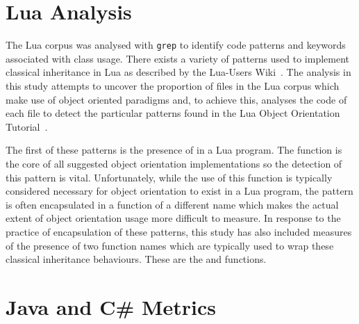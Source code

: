 \section{Lua Analysis}
\label{luaMethod}
The Lua corpus was analysed with \texttt{grep} to identify code patterns and keywords associated with class usage. There exists a variety of patterns used to implement classical inheritance in Lua as described by the Lua-Users Wiki~\cite{LuaObjectOrientation}. The analysis in this study attempts to uncover the proportion of files in the Lua corpus which make use of object oriented paradigms and, to achieve this, analyses the code of each file to detect the particular patterns found in the Lua Object Orientation Tutorial~\cite{LuaObjectOrientation}.
\newline

The first of these patterns is the presence of  in a Lua program. The  function is the core of all suggested object orientation implementations so the detection of this pattern is vital. Unfortunately, while the use of this function is typically considered necessary for object orientation to exist in a Lua program, the pattern is often encapsulated in a function of a different name which makes the actual extent of object orientation usage more difficult to measure. In response to the practice of encapsulation of these patterns, this study has also included measures of the presence of two function names which are typically used to wrap these classical inheritance behaviours. These are the  and  functions.

\section{Java and C\# Metrics}

